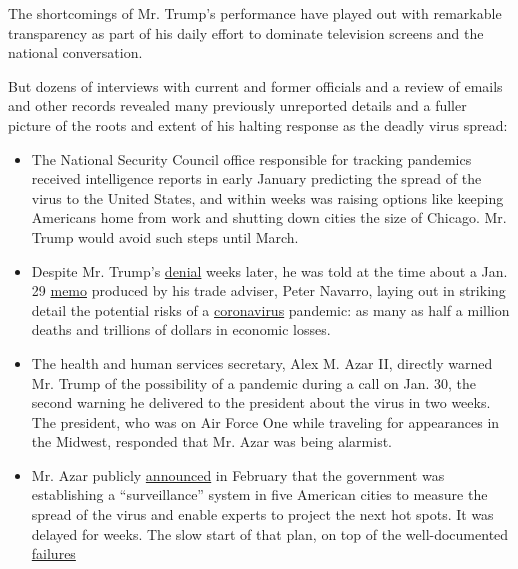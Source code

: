 The shortcomings of Mr. Trump's performance have played out with
remarkable transparency as part of his daily effort to dominate
television screens and the national conversation.

But dozens of interviews with current and former officials and a review
of emails and other records revealed many previously unreported details
and a fuller picture of the roots and extent of his halting response as
the deadly virus spread:

\begin{itemize}
\item
  The National Security Council office responsible for tracking
  pandemics received intelligence reports in early January predicting
  the spread of the virus to the United States, and within weeks was
  raising options like keeping Americans home from work and shutting
  down cities the size of Chicago. Mr. Trump would avoid such steps
  until March.
\item
  Despite Mr. Trump's
  \href{https://www.whitehouse.gov/briefings-statements/remarks-president-trump-vice-president-pence-members-coronavirus-task-force-press-briefing-april-7-2020/}{denial}
  weeks later, he was told at the time about a Jan. 29
  \href{https://www.nytimes3xbfgragh.onion/2020/04/06/us/politics/navarro-warning-trump-coronavirus.html}{memo}
  produced by his trade adviser, Peter Navarro, laying out in striking
  detail the potential risks of a
  \href{https://www.nytimes3xbfgragh.onion/2020/04/14/us/politics/trump-authority.html}{coronavirus}
  pandemic: as many as half a million deaths and trillions of dollars in
  economic losses.
\item
  The health and human services secretary, Alex M. Azar II, directly
  warned Mr. Trump of the possibility of a pandemic during a call on
  Jan. 30, the second warning he delivered to the president about the
  virus in two weeks. The president, who was on Air Force One while
  traveling for appearances in the Midwest, responded that Mr. Azar was
  being alarmist.
\item
  Mr. Azar publicly
  \href{https://www.cidrap.umn.edu/news-perspective/2020/02/cdc-flu-surveillance-system-enlisted-hunt-covid-19-cases}{announced}
  in February that the government was establishing a ``surveillance''
  system in five American cities to measure the spread of the virus and
  enable experts to project the next hot spots. It was delayed for
  weeks. The slow start of that plan, on top of the well-documented
  \href{https://www.nytimes3xbfgragh.onion/2020/03/28/us/testing-coronavirus-pandemic.html}{failures
}
\end{itemize}
